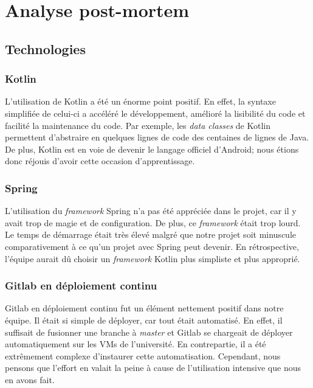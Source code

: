 \section{Analyse post-mortem}
    \subsection{Technologies}
        \subsubsection{Kotlin}
        L'utilisation de Kotlin a été un énorme point positif. En effet, la syntaxe simplifiée de celui-ci a accéléré le développement, amélioré la lisibilité du code et facilité la maintenance du code. Par exemple, les \emph{data classes} de Kotlin permettent d'abstraire en quelques lignes de code des centaines de lignes de Java. De plus, Kotlin est en voie de devenir le langage officiel d'Android; nous étions donc réjouis d'avoir cette occasion d'apprentissage.
        
        \subsubsection{Spring}
        L'utilisation du \emph{framework} Spring n'a pas été appréciée dans le projet, car il y avait trop de magie et de configuration. De plus, ce \emph{framework} était trop lourd. Le temps de démarrage était très élevé malgré que notre projet soit minuscule comparativement à ce qu'un projet avec Spring peut devenir. En rétrospective, l'équipe aurait dû choisir un \emph{framework} Kotlin plus simpliste et plus approprié.

        \subsubsection{Gitlab en déploiement continu}
        Gitlab en déploiement continu fut un élément nettement positif dans notre équipe. Il était si simple de déployer, car tout était automatisé. En effet, il suffisait de fusionner une branche à \emph{master} et Gitlab se chargeait de déployer automatiquement sur les VMs de l'université. En contrepartie, il a été extrêmement complexe d'instaurer cette automatisation. Cependant, nous pensons que l'effort en valait la peine à cause de l'utilisation intensive que nous en avons fait.
        
